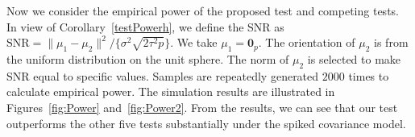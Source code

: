 \documentclass[times,sort&compress,3p]{elsarticle}
\theoremstyle{plain}
\theoremstyle{definition}
\theoremstyle{remark}
\begin{document}
Now we consider the empirical power of the proposed test and competing tests.
In view of Corollary~\ref{testPowerh}, we define the SNR as $\textrm{SNR}=\|\mu_1-\mu_2\|^2/\{\sigma^2\sqrt{2\tau^2 p}\}$.
We take $\mu_1=\mathbf{0}_p$.
The orientation of $\mu_2$ is from the uniform distribution on the unit sphere.
The norm of $\mu_2$ is selected to make SNR equal to specific values.
Samples are repeatedly generated $2000$ times to calculate empirical power.
The simulation results are illustrated in Figures~\ref{fig:Power} and~\ref{fig:Power2}.
From the results, we can see that our test outperforms the other five tests substantially under the spiked covariance model.

\begin{figure}
    \centering 
    \\
\end{figure}
\end{document}
